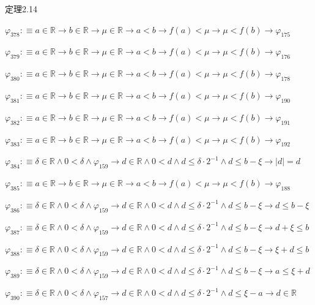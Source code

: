 \begin{fullproof}{定理2.14}
\begin{abbrevlist}
\item $\varphi_{378} :\equiv a \in \mathbb{R} \to b \in \mathbb{R} \to \mu \in \mathbb{R} \to a < b \to f(a) < \mu \to \mu < f(b) \to \varphi_{175}$
\item $\varphi_{379} :\equiv a \in \mathbb{R} \to b \in \mathbb{R} \to \mu \in \mathbb{R} \to a < b \to f(a) < \mu \to \mu < f(b) \to \varphi_{176}$
\item $\varphi_{380} :\equiv a \in \mathbb{R} \to b \in \mathbb{R} \to \mu \in \mathbb{R} \to a < b \to f(a) < \mu \to \mu < f(b) \to \varphi_{178}$
\item $\varphi_{381} :\equiv a \in \mathbb{R} \to b \in \mathbb{R} \to \mu \in \mathbb{R} \to a < b \to f(a) < \mu \to \mu < f(b) \to \varphi_{190}$
\item $\varphi_{382} :\equiv a \in \mathbb{R} \to b \in \mathbb{R} \to \mu \in \mathbb{R} \to a < b \to f(a) < \mu \to \mu < f(b) \to \varphi_{191}$
\item $\varphi_{383} :\equiv a \in \mathbb{R} \to b \in \mathbb{R} \to \mu \in \mathbb{R} \to a < b \to f(a) < \mu \to \mu < f(b) \to \varphi_{192}$
\item $\varphi_{384} :\equiv \delta \in \mathbb{R} \land 0 < \delta \land \varphi_{159} \to d \in \mathbb{R} \land 0 < d \land d \leq \delta \cdot 2^{-1} \land d \leq b - \xi \to \lvert d \rvert = d$
\item $\varphi_{385} :\equiv a \in \mathbb{R} \to b \in \mathbb{R} \to \mu \in \mathbb{R} \to a < b \to f(a) < \mu \to \mu < f(b) \to \varphi_{188}$
\item $\varphi_{386} :\equiv \delta \in \mathbb{R} \land 0 < \delta \land \varphi_{159} \to d \in \mathbb{R} \land 0 < d \land d \leq \delta \cdot 2^{-1} \land d \leq b - \xi \to d \leq b - \xi$
\item $\varphi_{387} :\equiv \delta \in \mathbb{R} \land 0 < \delta \land \varphi_{159} \to d \in \mathbb{R} \land 0 < d \land d \leq \delta \cdot 2^{-1} \land d \leq b - \xi \to d + \xi \leq b$
\item $\varphi_{388} :\equiv \delta \in \mathbb{R} \land 0 < \delta \land \varphi_{159} \to d \in \mathbb{R} \land 0 < d \land d \leq \delta \cdot 2^{-1} \land d \leq b - \xi \to \xi + d \leq b$
\item $\varphi_{389} :\equiv \delta \in \mathbb{R} \land 0 < \delta \land \varphi_{159} \to d \in \mathbb{R} \land 0 < d \land d \leq \delta \cdot 2^{-1} \land d \leq b - \xi \to a \leq \xi + d$
\item $\varphi_{390} :\equiv \delta \in \mathbb{R} \land 0 < \delta \land \varphi_{157} \to d \in \mathbb{R} \land 0 < d \land d \leq \delta \cdot 2^{-1} \land d \leq \xi - a \to d \in \mathbb{R}$

\end{abbrevlist}
\end{fullproof}
